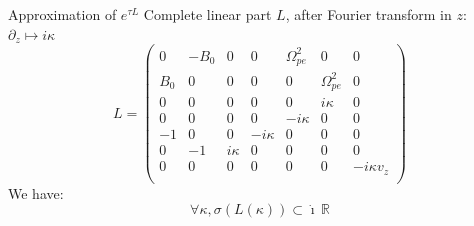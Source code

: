 \documentclass{beamer}
\begin{document}

\begin{frame}{Approximation of $e^{\tau L}$}
  Complete linear part $L$, after Fourier transform in $z$: $\partial_z\mapsto i\kappa$
  $$
    L = \begin{pmatrix}
      0   & -B_0 & 0       &  0       &  \Omega_{pe}^2 & 0             & 0 \\ 
      B_0 &  0   & 0       &  0       &  0             & \Omega_{pe}^2 & 0 \\
      0   &  0   & 0       &  0       &  0             & i\kappa       & 0 \\ 
      0   &  0   & 0       &  0       & -i\kappa       & 0             & 0 \\ 
      -1  &  0   & 0       & -i\kappa &  0             & 0             & 0 \\ 
      0   & -1   & i\kappa &  0       &  0             & 0             & 0 \\ 
      0   &  0   & 0       &  0       &  0             & 0             & -i\kappa v_z \\ 
    \end{pmatrix}
  $$
  We have:
  $$
    \forall \kappa, \sigma({L(\kappa)})\subset \dot{\imath}\,\mathbb{R}
  $$
\end{frame}
\end{document}

